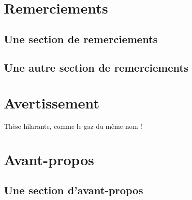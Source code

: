\documentclass[12pt,space=onehalf,version=final]{yathesis}
\begin{document}
\makelaboratory
%
\dedication{Je dédie ce travail\\à tous ceux qui le méritent}
\dedication{À mon directeur bien-aimé !}
\dedication{À mon co-directeur bien-co-aimé !}
\makededications
%
\makefrontepigraphs
%
\begin{abstract}
  \lipsum[1-2]
\end{abstract}
\begin{abstract}
  \lipsum[3-4]
\end{abstract}
%
\makeabstract
%
\chapter{Remerciements}
\section{Une section de remerciements}
\lipsum[1]
\section{Une autre section de remerciements}
\lipsum[2-9]
%
\chapter{Avertissement}
Thèse hilarante, comme le gaz du même nom !
%
\printacronyms
%
\printsymbols
%
\chapter{Avant-propos}
\section{Une section d'avant-propos}
\lipsum[30-45]
\end{document}
